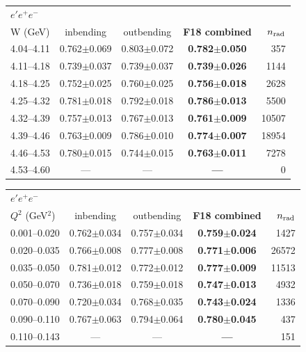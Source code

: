 \begin{tabular}{lcccr}\toprule
\multicolumn{5}{l}{$e'e^+e^-$}\\
W (GeV) & inbending & outbending & \textbf{F18 combined} & $n_{\rm rad}$ \\\midrule
4.04--4.11 & 0.762$\pm$0.069 & 0.803$\pm$0.072 & \textbf{0.782$\pm$0.050} & 357 \\
4.11--4.18 & 0.739$\pm$0.037 & 0.739$\pm$0.037 & \textbf{0.739$\pm$0.026} & 1144 \\
4.18--4.25 & 0.752$\pm$0.025 & 0.760$\pm$0.025 & \textbf{0.756$\pm$0.018} & 2628 \\
4.25--4.32 & 0.781$\pm$0.018 & 0.792$\pm$0.018 & \textbf{0.786$\pm$0.013} & 5500 \\
4.32--4.39 & 0.757$\pm$0.013 & 0.767$\pm$0.013 & \textbf{0.761$\pm$0.009} & 10507 \\
4.39--4.46 & 0.763$\pm$0.009 & 0.786$\pm$0.010 & \textbf{0.774$\pm$0.007} & 18954 \\
4.46--4.53 & 0.780$\pm$0.015 & 0.744$\pm$0.015 & \textbf{0.763$\pm$0.011} & 7278 \\
4.53--4.60 & --- & --- & \textbf{---} & 0 \\
\bottomrule\end{tabular}

\medskip

\begin{tabular}{lcccr}\toprule
\multicolumn{5}{l}{$e'e^+e^-$}\\
$Q^2$ (GeV$^2$) & inbending & outbending & \textbf{F18 combined} & $n_{\rm rad}$ \\\midrule
0.001--0.020 & 0.762$\pm$0.034 & 0.757$\pm$0.034 & \textbf{0.759$\pm$0.024} & 1427 \\
0.020--0.035 & 0.766$\pm$0.008 & 0.777$\pm$0.008 & \textbf{0.771$\pm$0.006} & 26572 \\
0.035--0.050 & 0.781$\pm$0.012 & 0.772$\pm$0.012 & \textbf{0.777$\pm$0.009} & 11513 \\
0.050--0.070 & 0.736$\pm$0.018 & 0.759$\pm$0.018 & \textbf{0.747$\pm$0.013} & 4932 \\
0.070--0.090 & 0.720$\pm$0.034 & 0.768$\pm$0.035 & \textbf{0.743$\pm$0.024} & 1336 \\
0.090--0.110 & 0.767$\pm$0.063 & 0.794$\pm$0.064 & \textbf{0.780$\pm$0.045} & 437 \\
0.110--0.143 & --- & --- & \textbf{---} & 151 \\
\bottomrule\end{tabular}

